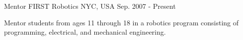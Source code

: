 
\begin{cventries}
  \cventry
    {Mentor} %
    {FIRST Robotics} %
    {NYC, USA} %
    {Sep. 2007 - Present} %
    {
        \begin{cvitems}
            \item {
                Mentor students from ages 11 through 18 in a robotics program consisting of programming, electrical,
                and mechanical engineering.
            }
        \end{cvitems}
    }
\end{cventries}
